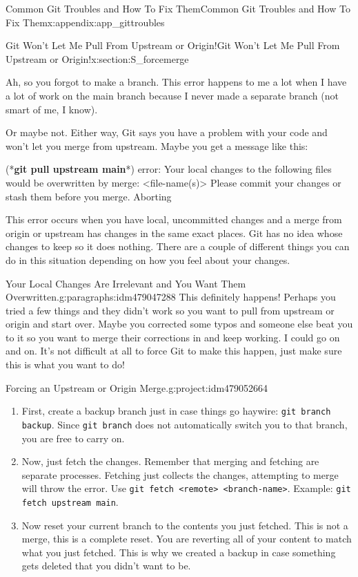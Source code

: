 \documentclass[oneside,10pt,]{book}
\newcommand{\mono}[1]{\texttt{#1}}
\newcommand{\consoleinput}[1]{\textbf{#1}}
\begin{document}
\begin{appendixptx}{Common Git Troubles and How To Fix Them}{}{Common Git Troubles and How To Fix Them}{}{}{x:appendix:app_gittroubles}
\begin{sectionptx}{Git Won't Let Me Pull From Upstream or Origin!}{}{Git Won't Let Me Pull From Upstream or Origin!}{}{}{x:section:S_forcemerge}
%
%
%
%
%
\begin{introduction}{}%
Ah, so you forgot to make a branch. This error happens to me a lot when I have a lot of work on the main branch because I never made a separate branch (not smart of me, I know).%
\par
Or maybe not. Either way, Git says you have a problem with your code and won't let you merge from upstream. Maybe you get a message like this: \begin{console}{0}{1}{0}
(*\consoleinput{git pull upstream main}*)
error: Your local changes to the following files would be overwritten by merge:
        <file-name(s)>
Please commit your changes or stash them before you merge.
Aborting
\end{console}
%
\par
This error occurs when you have local, uncommitted changes and a merge from origin or upstream has changes in the same exact places. Git has no idea whose changes to keep so it does nothing. There are a couple of different things you can do in this situation depending on how you feel about your changes.%
\end{introduction}%
\begin{paragraphs}{Your Local Changes Are Irrelevant and You Want Them Overwritten.}{g:paragraphs:idm479047288}%
This definitely happens! Perhaps you tried a few things and they didn't work so you want to pull from upstream or origin and start over. Maybe you corrected some typos and someone else beat you to it so you want to merge their corrections in and keep working. I could go on and on. It's not difficult at all to force Git to make this happen, just make sure this is what you want to do!%
\begin{project}{Forcing an Upstream or Origin Merge.}{g:project:idm479052664}%
\begin{enumerate}[font=\bfseries,label=(\alph*),ref=\alph*]
\item{}First, create a backup branch just in case things go haywire: \mono{git branch backup}. Since \mono{git branch} does not automatically switch you to that branch, you are free to carry on.%
\item{}Now, just fetch the changes. Remember that merging and fetching are separate processes. Fetching just collects the changes, attempting to merge will throw the error. Use \mono{git fetch <remote> <branch-name>}. Example: \mono{git fetch upstream main}.%
\item{}Now reset your current branch to the contents you just fetched. This is not a merge, this is a complete reset. You are reverting all of your content to match what you just fetched. This is why we created a backup in case something gets deleted that you didn't want to be.%

\end{enumerate}
\end{project}
\end{paragraphs}
\end{sectionptx}
\end{appendixptx}
\end{document}

